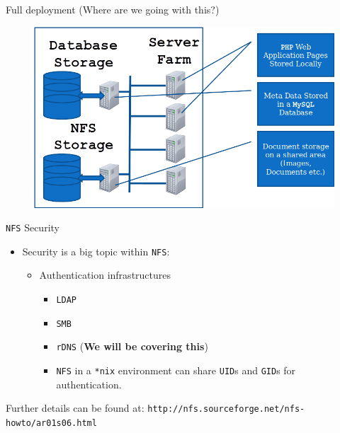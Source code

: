\documentclass[xcolor=table]{beamer}
\begin{document}
\begin{frame}{Full deployment (Where are we going with this?)}
  \begin{figure}
    \begin{center}
      \includegraphics[width=1\linewidth]{FullDeployment.png}
    \end{center}
  \end{figure}
\end{frame}

\begin{frame}{\texttt{NFS} Security}
  \begin{itemize}
    \item Security is a big topic within \texttt{NFS}:
      \begin{itemize}
        \item Authentication infrastructures  
          \begin{itemize}
            \item \texttt{LDAP}
            \item \texttt{SMB}
            \item \texttt{rDNS} (\textbf{We will be covering this})
            \item \texttt{NFS} in a \texttt{*nix} environment can share \texttt{UID}s and \texttt{GID}s for authentication.
          \end{itemize}
      \end{itemize}
  \end{itemize}
  \begin{tcolorbox}
    \begin{center}
      \scriptsize Further details can be found at: \texttt{http://nfs.sourceforge.net/nfs-howto/ar01s06.html}
    \end{center}
  \end{tcolorbox}
\end{frame}
\end{document}
